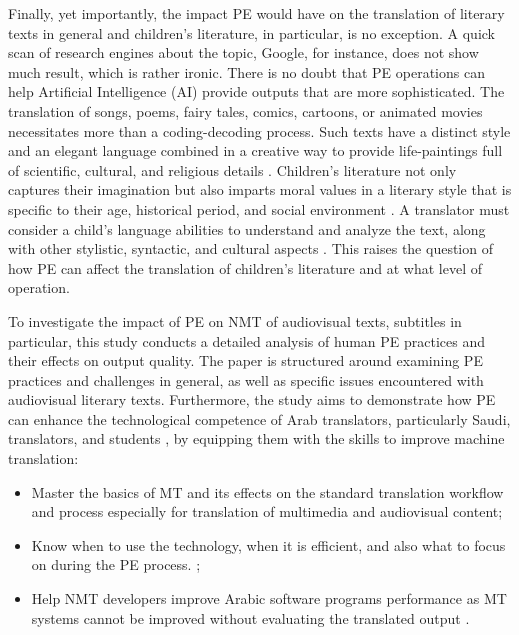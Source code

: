 \documentclass[english]{textolivre}
\begin{document}
Finally, yet importantly, the impact PE would have on the translation of literary texts in general and children’s literature, in particular, is no exception. A quick scan of research engines about the topic, Google, for instance, does not show much result, which is rather ironic. There is no doubt that PE operations can help Artificial Intelligence (AI) provide outputs that are more sophisticated. The translation of songs, poems, fairy tales, comics, cartoons, or animated movies necessitates more than a coding-decoding process. Such texts have a distinct style and an elegant language combined in a creative way to provide life-paintings full of scientific, cultural, and religious details \cite{bounaas2022}. Children’s literature not only captures their imagination but also imparts moral values in a literary style that is specific to their age, historical period, and social environment \cite{ibrokhimovich2022importance}. A translator must consider a child’s language abilities to understand and analyze the text, along with other stylistic, syntactic, and cultural aspects \cite{ibrokhimovich2022importance}. This raises the question of how PE can affect the translation of children’s literature and at what level of operation.

To investigate the impact of PE on NMT of audiovisual texts, subtitles in particular, this study conducts a detailed analysis of human PE practices and their effects on output quality. The paper is structured around examining PE practices and challenges in general, as well as specific issues encountered with audiovisual literary texts. Furthermore, the study aims to demonstrate how PE can enhance the technological competence of Arab translators, particularly Saudi, translators, and students \cite[p. 77]{tomaszkiewicz2018traduction}, by equipping them with the skills to improve machine translation:
\begin{itemize}
 \item Master the basics of MT and its effects on the standard translation workflow and process \cite[p. 78]{tomaszkiewicz2018traduction} especially for translation of multimedia and audiovisual content;
 \item Know when to use the technology, when it is efficient, and also what to focus on during the PE process. \cite[p.151]{loock2020no};
 \item Help NMT developers improve Arabic software programs performance as MT systems cannot be improved without evaluating the translated output \cite{rivera-trigueros_machine_2022}.
\end{itemize}
\end{document}

